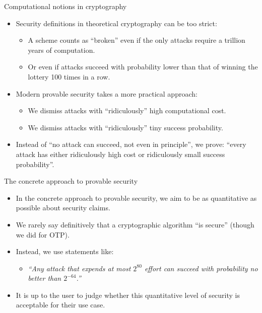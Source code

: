 \ifdefined\PRESENTATION\else\PassOptionsToClass{handout}{beamer}\fi\documentclass[aspectratio=169, lualatex]{beamer}
\begin{document}
\begin{frame}{Computational notions in cryptography}
	\begin{itemize}
		\item Security definitions in theoretical cryptography can be too strict:
		      \begin{itemize}
			      \item A scheme counts as ``broken'' even if the only attacks require a trillion years of computation.
			      \item Or even if attacks succeed with probability lower than that of winning the lottery 100 times in a row.
		      \end{itemize}
		\item Modern provable security takes a more practical approach:
		      \begin{itemize}
			      \item We dismiss attacks with ``ridiculously'' high computational cost.
			      \item We dismiss attacks with ``ridiculously'' tiny success probability.
		      \end{itemize}
		\item Instead of ``no attack can succeed, not even in principle'', we prove: ``every attack has either ridiculously high cost or ridiculously small success probability''.
	\end{itemize}
\end{frame}

\begin{frame}{The concrete approach to provable security}
	\begin{itemize}
		\item In the concrete approach to provable security, we aim to be as quantitative as possible about security claims.
		\item We rarely say definitively that a cryptographic algorithm ``is secure'' (though we did for OTP).
		\item Instead, we use statements like:
		      \begin{itemize}
			      \item \textit{``Any attack that expends at most $2^{80}$ effort can succeed with probability no better than $2^{-64}$.''}
		      \end{itemize}
		\item It is up to the user to judge whether this quantitative level of security is acceptable for their use case.
	\end{itemize}
\end{frame}
\end{document}
